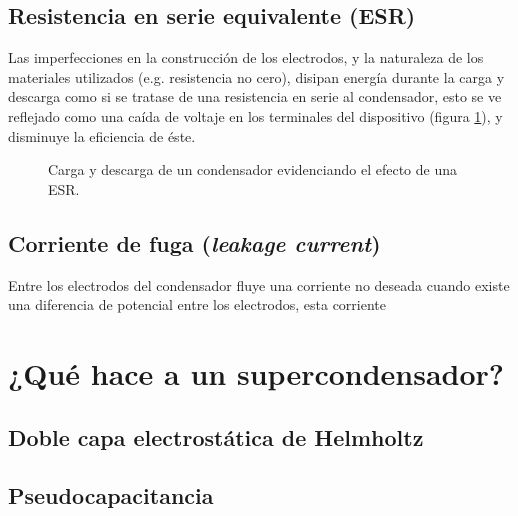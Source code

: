 \subsection{Resistencia en serie equivalente (ESR)}
Las imperfecciones en la construcción de los electrodos, y la naturaleza de los materiales utilizados (e.g. resistencia no cero), disipan energía durante la carga y descarga como si se tratase de una resistencia en serie al condensador, esto se ve reflejado como una caída de voltaje en los terminales del dispositivo (figura \ref{fig:plot:charge-discharge_esr}), y disminuye la eficiencia de éste.

\begin{figure}[h!]
	\caption{Carga y descarga de un condensador evidenciando el efecto de una ESR.}
	\label{fig:plot:charge-discharge_esr}
\end{figure}

\subsection{Corriente de fuga (\emph{leakage current})}
Entre los electrodos del condensador fluye una corriente no deseada cuando existe una diferencia de potencial entre los electrodos, esta corriente 

\section{¿Qué hace a un supercondensador?}

\subsection{Doble capa electrostática de Helmholtz}

\subsection{Pseudocapacitancia}